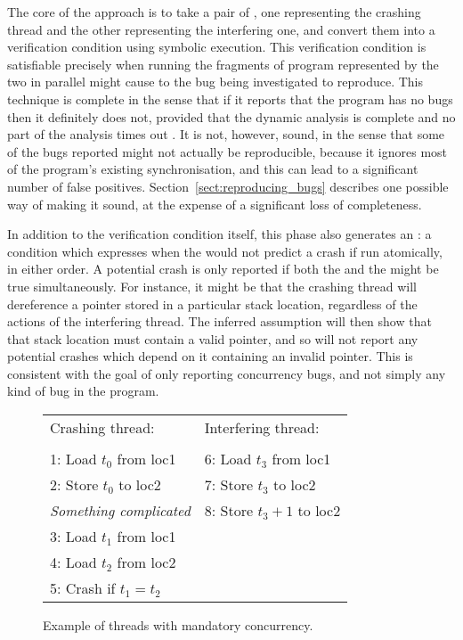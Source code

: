  The core of the approach is to take a pair of {\StateMachines}, one
representing the crashing thread and the other representing the
interfering one, and convert them into a verification
condition\needCite{} using symbolic execution\needCite{}.  This
verification condition is satisfiable precisely when running the
fragments of program represented by the two {\StateMachines} in
parallel might cause to the bug being investigated to reproduce.  This
technique is complete in the sense that if it reports that the program
has no bugs then it definitely does not, provided that the dynamic
analysis is complete and no part of the analysis times out .  It is not, however, sound,
in the sense that some of the bugs reported might not actually be
reproducible, because it ignores most of the program's existing
synchronisation, and this can lead to a significant number of false
positives.  Section~\ref{sect:reproducing_bugs} describes one possible
way of making it sound, at the expense of a significant loss of
completeness.

In addition to the verification condition itself, this phase also
generates an : a condition which expresses
when the {\StateMachines} would not predict a crash if run atomically,
in either order.  A potential crash is only reported if both the
 and the 
might be true simultaneously.  For instance, it might be that the
crashing thread will dereference a pointer stored in a particular
stack location, regardless of the actions of the interfering thread.
The inferred assumption will then show that that stack location must
contain a valid pointer, and so {\technique} will not report any
potential crashes which depend on it containing an invalid pointer.
This is consistent with the goal of only reporting concurrency bugs,
and not simply any kind of bug in the program.

\begin{figure}
\begin{centering}
\hfill
\begin{tabular}{p{8cm}l}
Crashing thread:\hfill         & Interfering thread: \\
\\
1: Load $t_0$ from loc1        & 6: Load $t_3$ from loc1 \\
2: Store $t_0$ to loc2         & 7: Store $t_3$ to loc2 \\
\textit{Something complicated} & 8: Store $t_3 + 1$ to loc2 \\
3: Load $t_1$ from loc1        & \\
4: Load $t_2$ from loc2        & \\
5: Crash if $t_1 = t_2$ & \\
\end{tabular}
\hfill
\end{centering}
\caption{Example of threads with mandatory concurrency.}
\label{fig:mandatory_concurrency1}
\end{figure}

